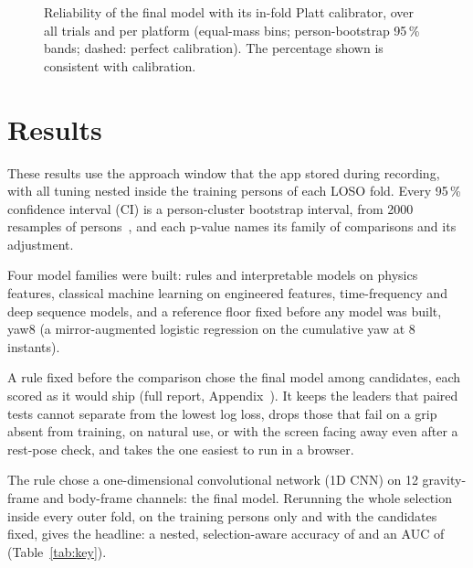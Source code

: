\begin{figure}[tbp]
\centering
{}
\caption{Reliability of the final model with its in-fold Platt calibrator, over all trials and per platform
(equal-mass bins; person-bootstrap 95\,\% bands; dashed: perfect calibration). The percentage shown is consistent
with calibration.}
\label{fig:FINAL_08_calibration}
\end{figure}

\section{Results}\label{sec:results}
These results use the approach window that the app stored during recording, with all tuning nested inside the
training persons of each LOSO fold. Every 95\,\% confidence interval (CI) is a person-cluster bootstrap
interval, from 2000 resamples of persons~\cite{saravanan2020bootstrap}, and each p-value names its family of
comparisons and its adjustment.

Four model families were built: rules and interpretable models on physics features, classical machine learning on
engineered features, time-frequency and deep sequence models, and a reference floor fixed before any model was built,
yaw8 (a mirror-augmented logistic regression on the cumulative yaw at 8 instants).

A rule fixed before the comparison chose the final model among  candidates, each scored as it
would ship (full report, Appendix~). It keeps the leaders that paired tests cannot separate from
the lowest log loss, drops those that fail on a grip absent from training, on natural use, or with the screen facing
away even after a rest-pose check, and takes the one easiest to run in a browser.

The rule chose a one-dimensional convolutional network (1D CNN) on 12 gravity-frame and body-frame channels: the
final model. Rerunning the whole selection inside every outer fold, on the training persons only and with the
candidates fixed, gives the headline: a nested, selection-aware accuracy of  and an AUC
of  (Table~\ref{tab:key}).

